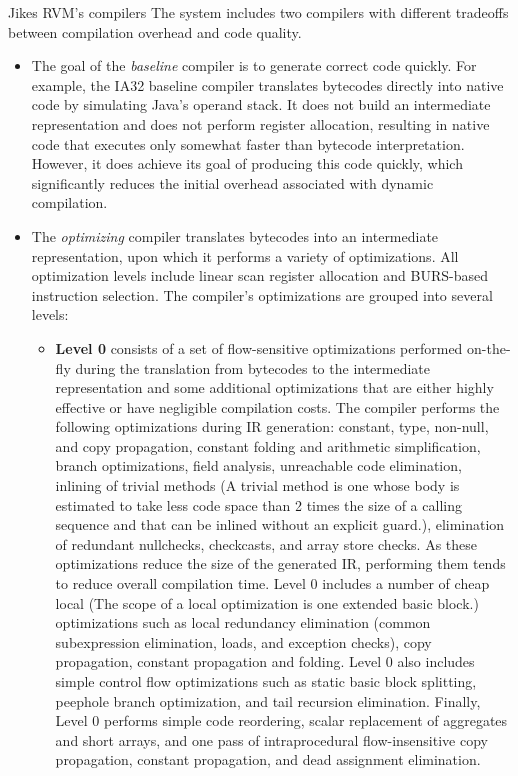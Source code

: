 \begin{section}{Jikes RVM's compilers}
The system includes two compilers with different tradeoffs between compilation overhead and code quality.
\begin{itemize}
    \item The goal of the \textit{baseline} compiler is to generate correct code quickly. For example, the IA32 baseline compiler translates bytecodes directly into native code by simulating Java's operand stack. It does not build an intermediate representation and does not perform register allocation, resulting in native code that executes only somewhat faster than bytecode interpretation.  However, it does achieve its goal of producing this code quickly, which significantly reduces the initial overhead associated with dynamic compilation.
    \item The \textit{optimizing} compiler translates bytecodes into an intermediate representation, upon which it performs a variety of optimizations.  All optimization levels include linear scan register allocation and BURS-based instruction selection. The compiler's optimizations are grouped into several levels:
      \begin{itemize}
        \item \textbf{Level 0} consists of a set of flow-sensitive optimizations performed on-the-fly during the translation from bytecodes to the intermediate representation and some additional optimizations that are either highly effective or have negligible compilation costs. The compiler performs the following optimizations during IR generation: constant, type, non-null, and copy propagation, constant folding and arithmetic simplification, branch optimizations, field analysis, unreachable code elimination, inlining of trivial methods (A trivial method is one whose body is estimated to take less code space than 2 times the size of a calling sequence and that can be inlined without an explicit guard.), elimination of redundant nullchecks, checkcasts, and array store checks.  As these optimizations reduce the size of the generated IR, performing them tends to reduce overall compilation time. Level 0 includes a number of cheap local (The scope of a local optimization is one extended basic block.) optimizations such as local redundancy elimination (common subexpression elimination, loads, and exception checks), copy propagation, constant propagation and folding. Level 0 also includes simple control flow optimizations such as static basic block splitting, peephole branch optimization, and tail recursion elimination. Finally, Level 0 performs simple code reordering, scalar replacement of aggregates and short arrays, and one pass of intraprocedural flow-insensitive copy propagation, constant propagation, and dead assignment elimination.

\end{itemize}
\end{itemize}
\end{section}

